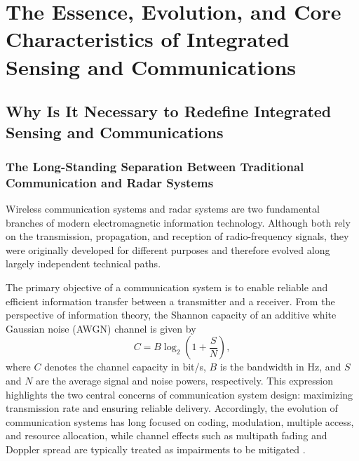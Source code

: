
\section{The Essence, Evolution, and Core Characteristics of Integrated Sensing and Communications}
\label{sec:ch1-essential-definition}


\subsection{Why Is It Necessary to Redefine Integrated Sensing and Communications}
\label{subsec:ch1-why-redefine-isac}
\subsubsection{The Long-Standing Separation Between Traditional Communication and Radar Systems}
\label{subsubsec:ch1-traditional-separation}

Wireless communication systems and radar systems are two fundamental branches of modern electromagnetic information technology. Although both rely on the transmission, propagation, and reception of radio-frequency signals, they were originally developed for different purposes and therefore evolved along largely independent technical paths.

The primary objective of a communication system is to enable reliable and efficient information transfer between a transmitter and a receiver. From the perspective of information theory, the Shannon capacity of an additive white Gaussian noise (AWGN) channel is given by \cite{Shannon1948}
\begin{equation}
C = B \log_2 \left( 1 + \frac{S}{N} \right),
\end{equation}
where $C$ denotes the channel capacity in bit/s, $B$ is the bandwidth in Hz, and $S$ and $N$ are the average signal and noise powers, respectively. This expression highlights the two central concerns of communication system design: maximizing transmission rate and ensuring reliable delivery. Accordingly, the evolution of communication systems has long focused on coding, modulation, multiple access, and resource allocation, while channel effects such as multipath fading and Doppler spread are typically treated as impairments to be mitigated \cite{Goldsmith2005,Andrews2014,TS38300}.

